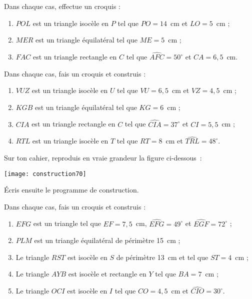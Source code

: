 \begin{exercice}
Dans chaque cas, effectue un croquis :
 \begin{enumerate}
  \item $POL$ est un triangle isocèle en $P$ tel que $PO = 14$ cm et $LO = 5$ cm ;
  \item $MER$ est un triangle équilatéral tel que $ME = 5$ cm ;
  \item $FAC$ est un triangle rectangle en $C$ tel que $\widehat{AFC}= 50^\circ$ et $CA = 6,5$ cm.  
  \end{enumerate}
\end{exercice}


\begin{exercice}
Dans chaque cas, fais un croquis et construis :
 \begin{enumerate}
  \item $VUZ$ est un triangle isocèle en $U$ tel que $VU = 6,5$ cm et $VZ = 4,5$ cm ;
  \item $KGB$ est un triangle équilatéral tel que $KG = 6$ cm ;
  \item $CIA$ est un triangle rectangle en $C$ tel que $\widehat{CIA} = 37^\circ$ et $CI = 5,5$ cm ;
  \item $RTL$ est un triangle isocèle en $T$ tel que $RT = 8$ cm et $\widehat{TRL} = 48^\circ$.
  \end{enumerate}
\end{exercice}


\begin{exercice}
Sur ton cahier, reproduis en vraie grandeur la figure ci-dessous :
\begin{center} \texttt{[image: construction70]} \end{center}
Écris ensuite le programme de construction.
\end{exercice}


\begin{exercice}
Dans chaque cas, fais un croquis et construis :
 \begin{enumerate}
  \item $EFG$ est un triangle tel que $EF = 7,5$ cm, $\widehat{EFG} = 49^\circ$ et $\widehat{EGF} = 72^\circ$ ;
  \item $PLM$ est un triangle équilatéral de périmètre 15 cm ;
  \item Le triangle $RST$ est isocèle en $S$ de périmètre 13 cm et tel que $ST = 4$ cm ;
  \item Le triangle $AYB$ est isocèle et rectangle en $Y$ tel que $BA = 7$ cm ;
  \item Le triangle $OCI$ est isocèle en $I$ tel que $CO = 4,5$ cm et $\widehat{CIO} = 30^\circ$.
  \end{enumerate}
\end{exercice}


